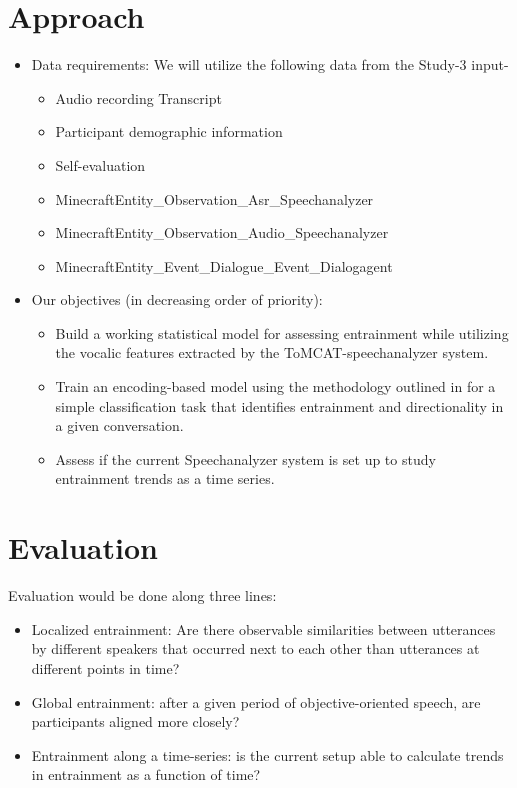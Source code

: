 \section{Approach}
\begin{itemize}
    \item Data requirements: We will utilize the following data from the Study-3 input-
        \begin{itemize}               
               \item Audio recording
                Transcript
               \item Participant demographic information
               \item Self-evaluation
               \item MinecraftEntity\_Observation\_Asr\_Speechanalyzer
               \item MinecraftEntity\_Observation\_Audio\_Speechanalyzer
               \item MinecraftEntity\_Event\_Dialogue\_Event\_Dialogagent
        \end{itemize}
    \item Our objectives (in decreasing order of priority):
\begin{itemize} 
    \item Build a working statistical model for assessing entrainment while utilizing the vocalic features extracted by the ToMCAT-speechanalyzer system.         
    \item Train an encoding-based model using the methodology outlined in \textcite{nasir2020} for a simple classification task that identifies entrainment and directionality in a given conversation.
    \item Assess if the current Speechanalyzer system is set up to study entrainment trends as a time series. 
\end{itemize} 
\end{itemize}

\section{Evaluation}
Evaluation would be done along three lines:
\begin{itemize}

    \item Localized entrainment: Are there observable similarities between utterances by different speakers that occurred next to each other than utterances at different points in time?
    \item Global entrainment: after a given period of objective-oriented speech, are participants aligned more closely? 
    \item Entrainment along a time-series: is the current setup able to calculate trends in entrainment as a function of time?

\end{itemize}
